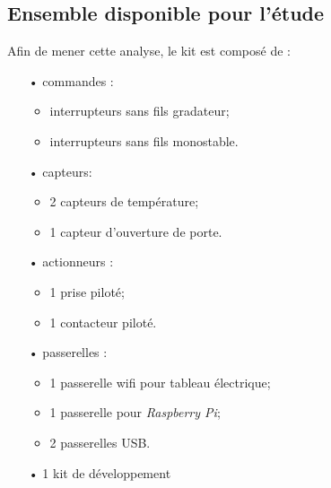 \documentclass{rapportENS}
\begin{document}
\subsection{Ensemble disponible pour l'étude}
Afin de mener cette analyse, le kit est composé de :
\vspace{0.1cm}
\begin{itemize}
\item[•] commandes : 
\vspace{0.1cm}
\begin{itemize}
    \item interrupteurs sans fils gradateur;
    \item interrupteurs sans fils monostable.
\end{itemize}
\vspace{0.1cm}
\item[•] capteurs:
\vspace{0.1cm}
\begin{itemize}
    \item 2 capteurs de température;
    \item 1 capteur d'ouverture de porte.
\end{itemize}
\vspace{0.1cm}
\item[•] actionneurs :
\vspace{0.1cm}
\begin{itemize}
    \item 1 prise piloté;
    \item 1 contacteur piloté.
\end{itemize}
\vspace{0.1cm}
\item[•] passerelles : 
\vspace{0.1cm}
\begin{itemize}
    \item 1 passerelle wifi pour tableau électrique;
    \item 1 passerelle pour \textit{Raspberry Pi};
    \item 2 passerelles USB.
\end{itemize}
\vspace{0.1cm}
\item[•] 1 kit de développement  
\end{itemize} 
\vspace{0.1cm}
\end{document}

